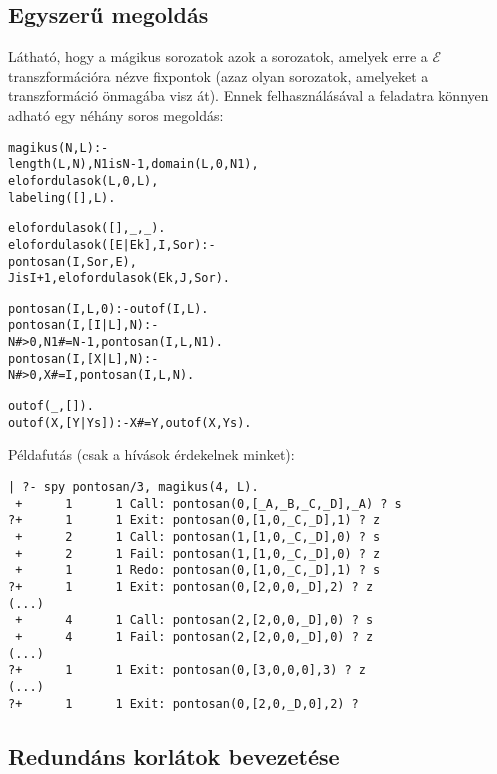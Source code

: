 \subsection{Egyszerű \clpfd megoldás}

Látható, hogy a mágikus sorozatok azok a sorozatok, amelyek erre a $\mathcal{E}$
transzformációra nézve fixpontok (azaz olyan sorozatok, amelyeket a transzformáció
önmagába visz át). Ennek felhasználásával a feladatra könnyen adható egy néhány
soros \clpfd megoldás:

\begin{alltt}
% Az L lista egy N hosszúságú mágikus sorozat.
magikus(N, L) :-
        length(L, N), N1 is N-1, domain(L, 0, N1),
        elofordulasok(L, 0, L),
        labeling([], L).             % most felesleges

% elofordulasok([E\(_\cd{i}\), E\(_\cd{i+1}\), \ldots], i, Sor): Sor-ban az i
% szám E\(_\cd{i}\)-szer, az i+1 szám E\(_\cd{i+1}\)-szer stb. fordul elő.
% Ez a predikátum valósítja meg a fenti előfordulás-sorozat transzformációt
elofordulasok([], _, _).
elofordulasok([E|Ek], I, Sor) :-
        pontosan(I, Sor, E),
        J is I+1, elofordulasok(Ek, J, Sor).

% pontosan(I, L, E): Az I szám L-ben E-szer fordul elő.
pontosan(I, L, 0) :- outof(I, L).
pontosan(I, [I|L], N) :-
        N #> 0, N1 #= N-1, pontosan(I, L, N1).
pontosan(I, [X|L], N) :-
        N #> 0, X #\bs= I, pontosan(I, L, N).

% outof(I, L): Az I szám L-ben nem fordul elő.
outof(_, []).
outof(X, [Y|Ys]) :- X #\bs= Y, outof(X, Ys).
\end{alltt}

Példafutás (csak a  hívások érdekelnek minket):

\begin{verbatim}
| ?- spy pontosan/3, magikus(4, L).
 +      1      1 Call: pontosan(0,[_A,_B,_C,_D],_A) ? s
?+      1      1 Exit: pontosan(0,[1,0,_C,_D],1) ? z
 +      2      1 Call: pontosan(1,[1,0,_C,_D],0) ? s
 +      2      1 Fail: pontosan(1,[1,0,_C,_D],0) ? z
 +      1      1 Redo: pontosan(0,[1,0,_C,_D],1) ? s
?+      1      1 Exit: pontosan(0,[2,0,0,_D],2) ? z
(...)
 +      4      1 Call: pontosan(2,[2,0,0,_D],0) ? s
 +      4      1 Fail: pontosan(2,[2,0,0,_D],0) ? z
(...)
?+      1      1 Exit: pontosan(0,[3,0,0,0],3) ? z
(...)
?+      1      1 Exit: pontosan(0,[2,0,_D,0],2) ?
\end{verbatim}

\subsection{Redundáns korlátok bevezetése}

